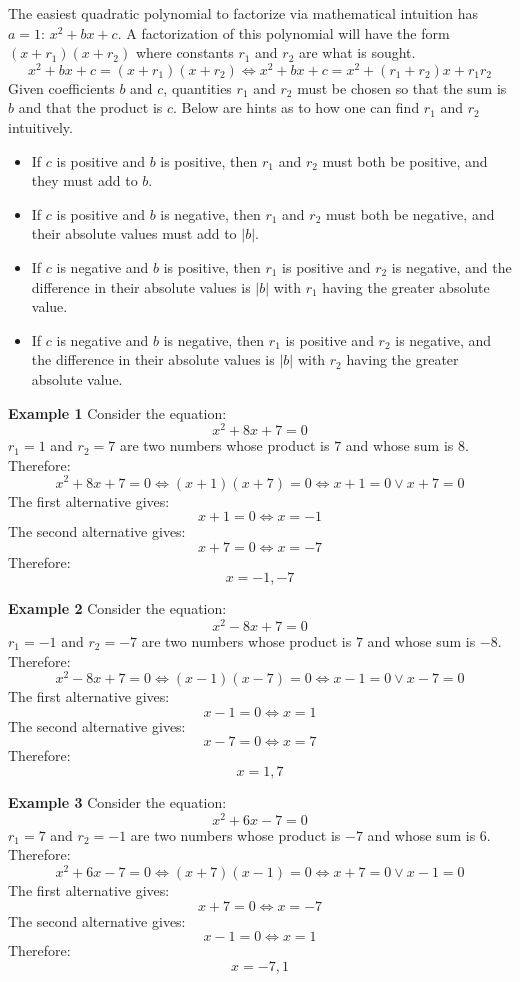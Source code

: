 \documentclass{article}
\begin{document}
The easiest quadratic polynomial to factorize via mathematical intuition has \(a = 1\): \(x^2 + bx + c\). A factorization of this polynomial will have the form \((x + r_1)(x + r_2)\) where constants \(r_1\) and \(r_2\) are what is sought.
\[x^2 + bx + c = (x + r_1)(x + r_2) \iff x^2 + bx + c = x^2 + (r_1 + r_2)x + r_1r_2\]
Given coefficients \(b\) and \(c\), quantities \(r_1\) and \(r_2\) must be chosen so that the sum is \(b\) and that the product is \(c\). Below are hints as to how one can find \(r_1\) and \(r_2\) intuitively. 
\begin{itemize}
\item If \(c\) is positive and \(b\) is positive, then \(r_1\) and \(r_2\) must both be positive, and they must add to \(b\). 
\item If \(c\) is positive and \(b\) is negative, then \(r_1\) and \(r_2\) must both be negative, and their absolute values must add to \(|b|\). 
\item If \(c\) is negative and \(b\) is positive, then \(r_1\) is positive and \(r_2\) is negative, and the difference in their absolute values is \(|b|\) with \(r_1\) having the greater absolute value. 
\item If \(c\) is negative and \(b\) is negative, then \(r_1\) is positive and \(r_2\) is negative, and the difference in their absolute values is \(|b|\) with \(r_2\) having the greater absolute value. 
\end{itemize}

\textbf{Example 1}
Consider the equation:
\[x^2 + 8x + 7 = 0\]
\(r_1 = 1\) and \(r_2 = 7\) are two numbers whose product is \(7\) and whose sum is \(8\).
Therefore:
\[x^2 + 8x + 7 = 0 \iff (x + 1)(x + 7) = 0 \iff x + 1 = 0 \vee x + 7 = 0\]
The first alternative gives: 
\[x + 1 = 0 \iff x = -1\]
The second alternative gives:
\[x + 7 = 0 \iff x = -7\]
Therefore:
\[x = -1, -7\]

\textbf{Example 2}
Consider the equation:
\[x^2 - 8x + 7 = 0\]
\(r_1 = -1\) and \(r_2 = -7\) are two numbers whose product is \(7\) and whose sum is \(-8\).
Therefore:
\[x^2 - 8x + 7 = 0 \iff (x - 1)(x - 7) = 0 \iff x - 1 = 0 \vee x - 7 = 0\]
The first alternative gives: 
\[x - 1 = 0 \iff x = 1\]
The second alternative gives:
\[x - 7 = 0 \iff x = 7\]
Therefore:
\[x = 1, 7\]

\textbf{Example 3}
Consider the equation:
\[x^2 + 6x - 7 = 0\]
\(r_1 = 7\) and \(r_2 = -1\) are two numbers whose product is \(-7\) and whose sum is \(6\).
Therefore:
\[x^2 + 6x - 7 = 0 \iff (x + 7)(x - 1) = 0 \iff x + 7 = 0 \vee x - 1 = 0\]
The first alternative gives: 
\[x + 7 = 0 \iff x = -7\]
The second alternative gives:
\[x - 1 = 0 \iff x = 1\]
Therefore:
\[x = -7, 1\]
\end{document}
